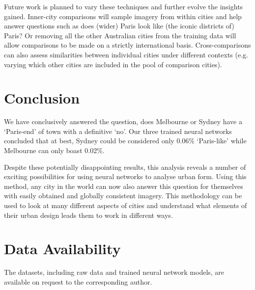 \documentclass[Crown,sageh,times]{sagej}
\begin{document}
Future work is planned to vary these techniques and further evolve the insights gained. Inner-city comparisons will sample imagery from within cities and help answer questions such as does (wider) Paris look like (the iconic districts of) Paris? Or removing all the other Australian cities from the training data will allow comparisons to be made on a strictly international basis. Cross-comparisons can also assess similarities between individual cities under different contexts (e.g. varying which other cities are included in the pool of comparison cities). 

\section{Conclusion}\label{sec:conclusion}

We have conclusively answered the question, does Melbourne or Sydney have a `Paris-end' of town with a definitive `no'. Our three trained neural networks concluded that at best, Sydney could be considered only 0.06\% `Paris-like' while Melbourne can only boast 0.02\%.   

Despite these potentially disappointing results, this analysis reveals a number of exciting possibilities for using neural networks to analyse urban form. Using this method, any city in the world can now also answer this question for themselves with easily obtained and globally consistent imagery. This methodology can be used to look at many different aspects of cities and understand what elements of their urban design leads them to work in different ways.



\section{Data Availability}\label{sec:methods6} 
The datasets, including raw data and trained neural network models, are available on request to the corresponding author.





\theendnotes

  
  
\end{document}
